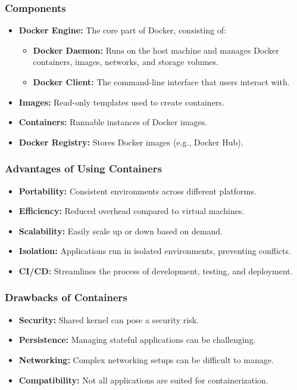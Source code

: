 \documentclass[aspectratio=169, table]{beamer}
\begin{document}
    \begin{frame}
        \frametitle{Components}
        \begin{itemize}
            \item \textbf{Docker Engine:} The core part of Docker, consisting of:
            \begin{itemize}
                \item \textbf{Docker Daemon:} Runs on the host machine and manages Docker containers, images, networks, and storage volumes.
                \item \textbf{Docker Client:} The command-line interface that users interact with.
            \end{itemize}
            \item \textbf{Images:} Read-only templates used to create containers.
            \item \textbf{Containers:} Runnable instances of Docker images.
            \item \textbf{Docker Registry:} Stores Docker images (e.g., Docker Hub).
        \end{itemize}
    \end{frame}

    \begin{frame}
        \frametitle{Advantages of Using Containers}
        \begin{itemize}
            \item \textbf{Portability:} Consistent environments across different platforms.
            \item \textbf{Efficiency:} Reduced overhead compared to virtual machines.
            \item \textbf{Scalability:} Easily scale up or down based on demand.
            \item \textbf{Isolation:} Applications run in isolated environments, preventing conflicts.
            \item \textbf{CI/CD:} Streamlines the process of development, testing, and deployment.
        \end{itemize}
    \end{frame}


    \begin{frame}
        \frametitle{Drawbacks of Containers}
        \begin{itemize}
            \item \textbf{Security:} Shared kernel can pose a security risk.
            \item \textbf{Persistence:} Managing stateful applications can be challenging.
            \item \textbf{Networking:} Complex networking setups can be difficult to manage.
            \item \textbf{Compatibility:} Not all applications are suited for containerization.
        \end{itemize}
    \end{frame}
\end{document}
